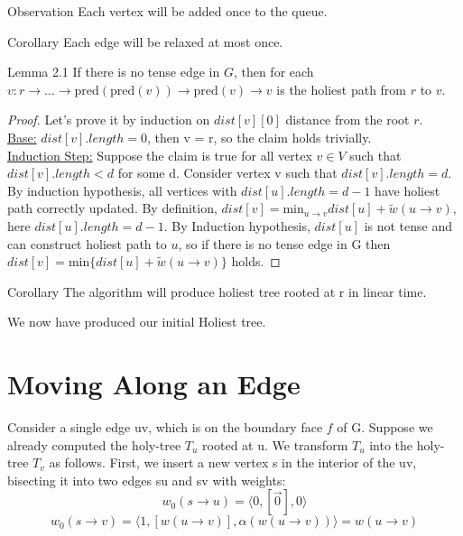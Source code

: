 \documentclass{article}
\begin{document}
\vspace{0.5cm}

\begin{oneshot}{Observation}
Each vertex will be added once to the queue.
\end{oneshot}

\begin{oneshot}{Corollary}
Each edge will be relaxed at most once.
\end{oneshot}

\begin{oneshot}{Lemma 2.1}
If there is no tense edge in $G$, then for each 
$v: r \rightarrow \ldots \rightarrow \text{pred}(\text{pred}(v)) \rightarrow 
\text{pred}(v) \rightarrow v$ is the holiest path from $r$ to $v$.
\end{oneshot}
\begin{proof}
Let's prove it by induction on $dist[v][0]$ distance from the root
$r$. \\
\underline{Base:} $dist[v].length = 0$, then v = r, so the claim holds trivially. \\
\underline{Induction Step:} Suppose the claim is true for all vertex $v \in V$ 
such that $dist[v].length < d$ for some d. Consider vertex v such that 
$dist[v].length=d$. By induction hypothesis, all vertices with 
$dist[u].length = d-1$ have holiest path 
correctly updated. By definition, $dist[v] = \text{min}_{u \rightarrow v}{
dist[u] + \tilde w(u \rightarrow v)}$, here $dist[u].length = d-1$. 
By Induction hypothesis, $dist[u]$ is not tense and can construct holiest 
path to $u$, so if there is no tense edge in G then 
$dist[v] = \text{min}\{dist[u] + \tilde w(u \rightarrow v)\}$ 
holds.
\end{proof}

\begin{oneshot}{Corollary}
The algorithm will produce holiest tree rooted at r in linear time.
\end{oneshot}

We now have produced our initial Holiest tree.

\section{Moving Along an Edge}
Consider a single edge uv, which is on the boundary face $f$ of G. Suppose we
already computed the holy-tree $T_u$ rooted at u.  We transform $T_u$
into the holy-tree $T_v$ as follows. First, we insert a new vertex s in the
interior of the uv, bisecting it into two edges su and sv with weights:
\[ w_{0}(s \rightarrow u) = \langle 0, [\vec{0}], 0 \rangle \]
\[ w_{0}(s \rightarrow v) = \langle 1, [w(u \rightarrow v)], 
  \alpha(w(u \rightarrow v)) \rangle = w(u \rightarrow v)\]
\end{document}
